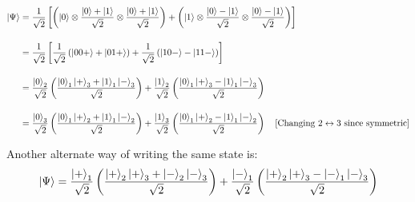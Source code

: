 \documentclass{scrartcl}
\begin{document}
\begin{align*}
    \ket{\Psi} &= \frac{1}{\sqrt{2}} \left[ \left( \ket{0} \otimes \frac{\ket{0} + \ket{1}}{\sqrt{2}} \otimes \frac{\ket{0} + \ket{1}}{\sqrt{2}} \right) + \left( \ket{1} \otimes \frac{\ket{0} - \ket{1}}{\sqrt{2}} \otimes \frac{\ket{0} - \ket{1}}{\sqrt{2}} \right) \right] \\[0.4cm]
    &= \frac{1}{\sqrt{2}} \left[ \frac{1}{\sqrt{2}} \left( \ket{00+} + \ket{01+} \right) + \frac{1}{\sqrt{2}} \left( \ket{10-} - \ket{11-} \right) \right] \\[0.4cm]
    &=\frac{\ket{0}_2}{\sqrt{2}}\left( \frac{\ket{0}_1\ket{+}_3 +\ket{1}_1\ket{-}_3}{\sqrt{2}} \right)+\frac{\ket{1}_2}{\sqrt{2}}\left( \frac{\ket{0}_1\ket{+}_3 -\ket{1}_1\ket{-}_3}{\sqrt{2}} \right)  \\[0.4cm]
    &= \frac{\ket{0}_3}{\sqrt{2}}\left( \frac{\ket{0}_1\ket{+}_2 +\ket{1}_1\ket{-}_2}{\sqrt{2}} \right)+\frac{\ket{1}_3}{\sqrt{2}}\left( \frac{\ket{0}_1\ket{+}_2 -\ket{1}_1\ket{-}_2}{\sqrt{2}} \right) \quad \text{[Changing $2\leftrightarrow 3$ since symmetric]}
    \end{align*}

Another alternate way of writing the same state is:
\[
\ket{\Psi} = \frac{\ket{+}_1}{\sqrt{2}}\left( \frac{\ket{+}_2\ket{+}_3 +\ket{-}_2\ket{-}_3}{\sqrt{2}} \right)+\frac{\ket{-}_1}{\sqrt{2}}\left( \frac{\ket{+}_2\ket{+}_3 -\ket{-}_1\ket{-}_3}{\sqrt{2}} \right)
\]
\end{document}
